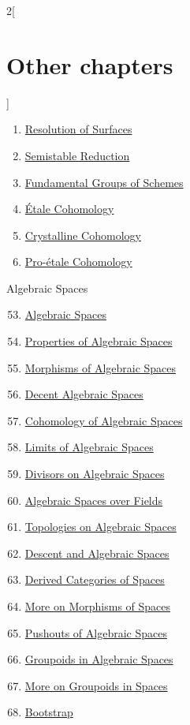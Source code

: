 \begin{multicols}{2}[\section{Other chapters}]
\begin{enumerate}
\item \hyperref[resolve-section-phantom]{Resolution of Surfaces}
\item \hyperref[models-section-phantom]{Semistable Reduction}
\item \hyperref[pione-section-phantom]{Fundamental Groups of Schemes}
\item \hyperref[etale-cohomology-section-phantom]{\'Etale Cohomology}
\item \hyperref[crystalline-section-phantom]{Crystalline Cohomology}
\item \hyperref[proetale-section-phantom]{Pro-\'etale Cohomology}
\end{enumerate}
Algebraic Spaces
\begin{enumerate}
\setcounter{enumi}{52}
\item \hyperref[spaces-section-phantom]{Algebraic Spaces}
\item \hyperref[spaces-properties-section-phantom]{Properties of Algebraic Spaces}
\item \hyperref[spaces-morphisms-section-phantom]{Morphisms of Algebraic Spaces}
\item \hyperref[decent-spaces-section-phantom]{Decent Algebraic Spaces}
\item \hyperref[spaces-cohomology-section-phantom]{Cohomology of Algebraic Spaces}
\item \hyperref[spaces-limits-section-phantom]{Limits of Algebraic Spaces}
\item \hyperref[spaces-divisors-section-phantom]{Divisors on Algebraic Spaces}
\item \hyperref[spaces-over-fields-section-phantom]{Algebraic Spaces over Fields}
\item \hyperref[spaces-topologies-section-phantom]{Topologies on Algebraic Spaces}
\item \hyperref[spaces-descent-section-phantom]{Descent and Algebraic Spaces}
\item \hyperref[spaces-perfect-section-phantom]{Derived Categories of Spaces}
\item \hyperref[spaces-more-morphisms-section-phantom]{More on Morphisms of Spaces}
\item \hyperref[spaces-pushouts-section-phantom]{Pushouts of Algebraic Spaces}
\item \hyperref[spaces-groupoids-section-phantom]{Groupoids in Algebraic Spaces}
\item \hyperref[spaces-more-groupoids-section-phantom]{More on Groupoids in Spaces}
\item \hyperref[bootstrap-section-phantom]{Bootstrap}

\end{enumerate}
\end{multicols}
